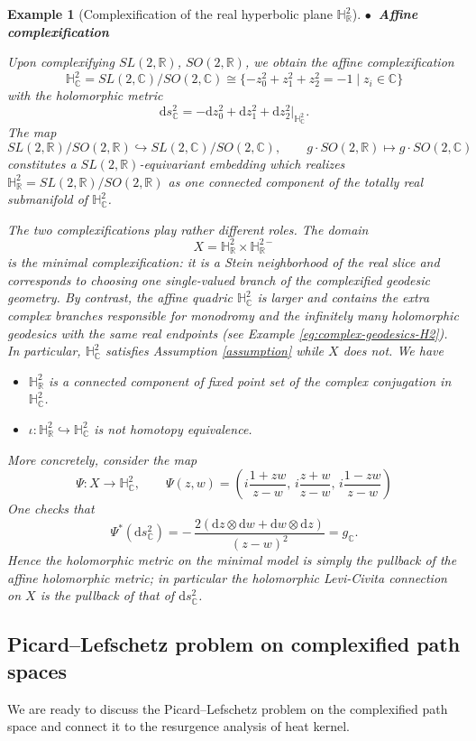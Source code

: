 \documentclass[11pt]{amsart}
\theoremstyle{plain}
\newtheorem{eg}[thm]{Example}
\theoremstyle{definition}
\newcommand{\R}{\mathbb{R}}
\newcommand{\C}{\mathbb{C}}
\newcommand{\dd}{\mathrm d}
\newcommand{\HH}{\mathbb{H}}
\begin{document}
\begin{eg}[Complexification of the real hyperbolic plane $\HH_{\R}^2$]
\vskip 0.2cm
\noindent$\bullet~$ \textbf{Affine complexification}
\vskip 0.1cm

Upon complexifying $SL(2,\R)$, $SO(2,\R)$, we obtain the affine complexification
\[\HH_{\C}^2=SL(2,\C)/SO(2,\C)\cong\{-z_0^2+z_1^2+z_2^2=-1\mid z_i\in\C\}\]
with the holomorphic metric
\[\dd s_{\C}^2=-\dd z_0^2+\dd z_1^2+\dd z_2^2\big|_{\HH_{\C}^2}.\]
The map
\[SL(2,\R)/SO(2,\R)\hookrightarrow SL(2,\C)/SO(2,\C),\qquad g\cdot SO(2,\R)\mapsto g\cdot SO(2,\C)\]
constitutes a $SL(2,\R)$-equivariant embedding which realizes $\HH_{\R}^2=SL(2,\R)/SO(2,\R)$ as one connected component of the totally real submanifold of $\HH_{\C}^2$. %

The two complexifications play rather different roles. The domain
\[
X=\HH_{\R}^2\times \HH_{\R}^{2-}
\]
is the minimal complexification: it is a Stein neighborhood of the real slice and corresponds to choosing one single-valued branch of the complexified geodesic geometry. By contrast, the affine quadric $\HH_{\C}^2$ is larger and contains the extra complex branches responsible for monodromy and the infinitely many holomorphic geodesics with the same real endpoints (see Example \ref{eg:complex-geodesics-H2}). In particular, $\HH^2_{\C}$ satisfies Assumption \ref{assumption} while $X$ does not. We have
\begin{itemize}
    \item $\HH_{\R}^2$ is a connected component of fixed point set of the complex conjugation in $\HH_{\C}^2$.
    \item $\iota:\HH_{\R}^2\hookrightarrow\HH_{\C}^2$ is not homotopy equivalence.
\end{itemize}


More concretely, consider the map
\[
\Psi:X\longrightarrow \HH_{\C}^2,\qquad
\Psi(z,w)=\left(
i\frac{1+zw}{z-w},\,
i\frac{z+w}{z-w},\,
i\frac{1-zw}{z-w}
\right)
\]
One checks that
\[
\Psi^*(\dd s_{\C}^2)= -\,\frac{2(\dd z\otimes \dd w+\dd w\otimes \dd z)}{(z-w)^2}=g_{\C}.
\]
Hence the holomorphic metric on the minimal model is simply the pullback of the affine holomorphic metric; in particular the holomorphic Levi-Civita connection on $X$ is the pullback of that of $\dd s_{\C}^2$.    

\end{eg}



\subsection{Picard–Lefschetz problem on complexified path spaces}\label{sec:PL-problem-path}
We are ready to discuss the Picard–Lefschetz problem on the complexified path space and connect it to the resurgence analysis of heat kernel. 
\end{document}
